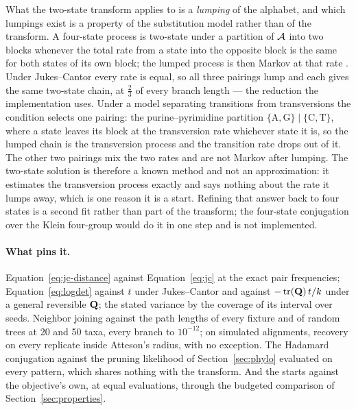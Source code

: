 \documentclass[11pt,a4paper]{article}
\begin{document}
What the two-state transform applies to is a \emph{lumping} of the alphabet,
and which lumpings exist is a property of the substitution model rather than
of the transform. A four-state process is two-state under a partition of
$\mathcal{A}$ into two blocks whenever the total rate from a state into the
opposite block is the same for both states of its own block; the lumped
process is then Markov at that rate \citep{felsenstein2004}. Under
Jukes--Cantor every rate is equal, so all three pairings lump and each gives
the same two-state chain, at $\tfrac{2}{3}$ of every branch length --- the
reduction the implementation uses. Under a model separating transitions from
transversions the condition selects one pairing: the purine--pyrimidine
partition $\{\mathrm{A},\mathrm{G}\} \mid \{\mathrm{C},\mathrm{T}\}$, where a
state leaves its block at the transversion rate whichever state it is, so the
lumped chain is the transversion process and the transition rate drops out of
it. The other two pairings mix the two rates and are not Markov after lumping.
The two-state solution is therefore a known method and not an approximation:
it estimates the transversion process exactly and says nothing about the rate
it lumps away, which is one reason it is a start. Refining that answer back to
four states is a second fit rather than part of the transform; the four-state
conjugation over the Klein four-group would do it in one step and is not
implemented.

\paragraph{What pins it.}
Equation~\ref{eq:jc-distance} against Equation~\ref{eq:jc} at the exact pair
frequencies; Equation~\ref{eq:logdet} against $t$ under Jukes--Cantor and
against $-\operatorname{tr}(\mathbf{Q})\,t/k$ under a general reversible $\mathbf{Q}$; the
stated variance by the coverage of its interval over seeds. Neighbor joining
against the path lengths of every fixture and of random trees at 20 and 50
taxa, every branch to $10^{-12}$; on simulated alignments, recovery on every
replicate inside Atteson's radius, with no exception. The Hadamard
conjugation against the pruning likelihood of Section~\ref{sec:phylo}
evaluated on every pattern, which shares nothing with the transform. And the
starts against the objective's own, at equal evaluations, through the
budgeted comparison of Section~\ref{sec:properties}.
\end{document}
